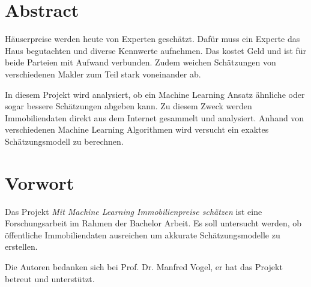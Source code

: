 \section*{Abstract}
Häuserpreise werden heute von Experten geschätzt. Dafür muss ein Experte das Haus begutachten und diverse Kennwerte aufnehmen. Das kostet Geld und ist für beide Parteien mit Aufwand verbunden. Zudem weichen Schätzungen von verschiedenen Makler zum Teil stark voneinander ab.

In diesem Projekt wird analysiert, ob ein Machine Learning Ansatz ähnliche oder sogar bessere Schätzungen abgeben kann. Zu diesem Zweck werden Immobiliendaten direkt aus dem Internet gesammelt und analysiert. Anhand von verschiedenen Machine Learning Algorithmen wird versucht ein exaktes Schätzungsmodell zu berechnen.

\section*{Vorwort}
Das Projekt \emph{Mit Machine Learning Immobilienpreise schätzen} ist eine Forschungsarbeit im Rahmen der Bachelor Arbeit. Es soll untersucht werden, ob öffentliche Immobiliendaten ausreichen um akkurate Schätzungsmodelle zu erstellen.

Die Autoren bedanken sich bei Prof. Dr. Manfred Vogel, er hat das Projekt betreut und unterstützt.

